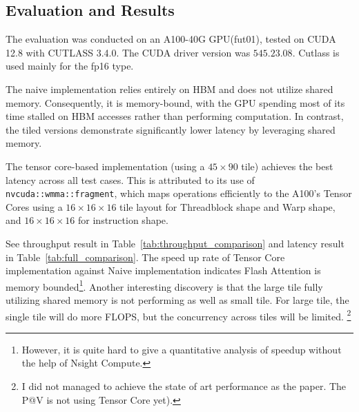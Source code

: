 \documentclass[11pt]{article}
\begin{document}
\subsection{Evaluation and Results}
The evaluation was conducted on an A100-40G GPU(fut01), tested on CUDA 12.8 with CUTLASS 3.4.0. The CUDA driver version was $545.23.08$. Cutlass is used mainly for the fp16 type.

The naive implementation relies entirely on HBM and does not utilize shared memory. Consequently, it is memory-bound, with the GPU spending most of its time stalled on HBM accesses rather than performing computation. In contrast, the tiled versions demonstrate significantly lower latency by leveraging shared memory.

The tensor core-based implementation (using a $45 \times 90$ tile) achieves the best latency across all test cases. This is attributed to its use of \texttt{nvcuda::wmma::fragment}, which maps operations efficiently to the A100's Tensor Cores using a $16 \times 16 \times 16$ tile layout for Threadblock shape and Warp shape, and $16 \times 16 \times 16$ for instruction shape.

See throughput result in Table~\ref{tab:throughput_comparison} and latency result in Table~\ref{tab:full_comparison}. The speed up rate of Tensor Core implementation against Naive implementation indicates Flash Attention is memory bounded\footnote{However, it is quite hard to give a quantitative analysis of speedup without the help of Nsight Compute.}. Another interesting discovery is that the large tile fully utilizing shared memory is not performing as well as small tile. For large tile, the single tile will do more FLOPS, but the concurrency across tiles will be limited. \footnote{I did not managed to achieve the state of art performance as the paper. The P@V is not using Tensor Core yet).}
\end{document}
